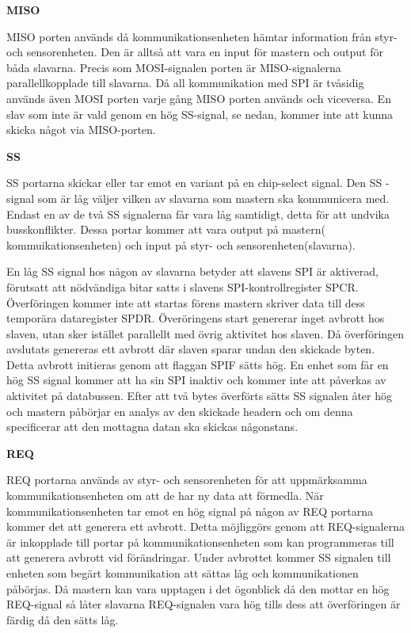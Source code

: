 \textbf{MISO}


MISO porten används då kommunikationsenheten hämtar information från styr- 
och sensorenheten. Den är alltså att vara en input för mastern och output för 
båda slavarna. Precis som MOSI-signalen porten är MISO-signalerna 
parallellkopplade till slavarna.  Då all kommunikation med SPI är tvåsidig 
används även MOSI porten varje gång MISO porten används och viceversa. En 
slav som inte är vald genom en hög SS-signal, se nedan, kommer inte 
att kunna skicka något via MISO-porten. 

\textbf{SS}
\label{sec:SS}


SS portarna skickar eller tar emot en variant på en chip-select signal. Den SS
-signal som är låg väljer vilken av slavarna som mastern ska kommunicera med. 
Endast en av de två SS signalerna får vara låg samtidigt, detta för att 
undvika busskonflikter. Dessa portar kommer att vara output på mastern(
kommuikationsenheten) och input på styr- och sensorenheten(slavarna).

En låg SS signal hos någon av slavarna betyder att slavens SPI är aktiverad, 
förutsatt att nödvändiga bitar satts i slavens SPI-kontrollregister 
SPCR. Överföringen kommer inte att startas förens mastern skriver data till 
dess temporära dataregister SPDR. Överöringens start genererar inget avbrott 
hos slaven, utan sker istället parallellt med övrig aktivitet hos slaven. Då 
överföringen avslutats genereras ett avbrott där slaven sparar undan den 
skickade byten. Detta avbrott initieras genom att flaggan SPIF sätts hög. En 
enhet som får en hög SS signal kommer att ha sin SPI inaktiv och kommer inte 
att påverkas av aktivitet på databussen. Efter att två bytes överförts sätts 
SS signalen åter hög och mastern påbörjar en analys av den skickade headern 
och om denna specificerar att den mottagna datan ska skickas någonstans.

\textbf{REQ}


REQ portarna används av styr- och sensorenheten för att uppmärksamma 
kommunikationsenheten om att de har ny data att förmedla. När 
kommunikationsenheten tar emot en hög signal på någon av REQ portarna kommer 
det att generera ett avbrott. Detta möjliggörs genom att REQ-signalerna är 
inkopplade till portar på kommunikationsenheten som kan programmeras till att 
generera avbrott vid förändringar. Under avbrottet kommer SS signalen till 
enheten som begärt kommunikation att sättas låg och kommunikationen påbörjas. 
Då mastern kan vara upptagen i det ögonblick då den mottar en hög REQ-signal 
så låter slavarna REQ-signalen vara hög tills dess att överföringen är färdig 
då den sätts låg.

